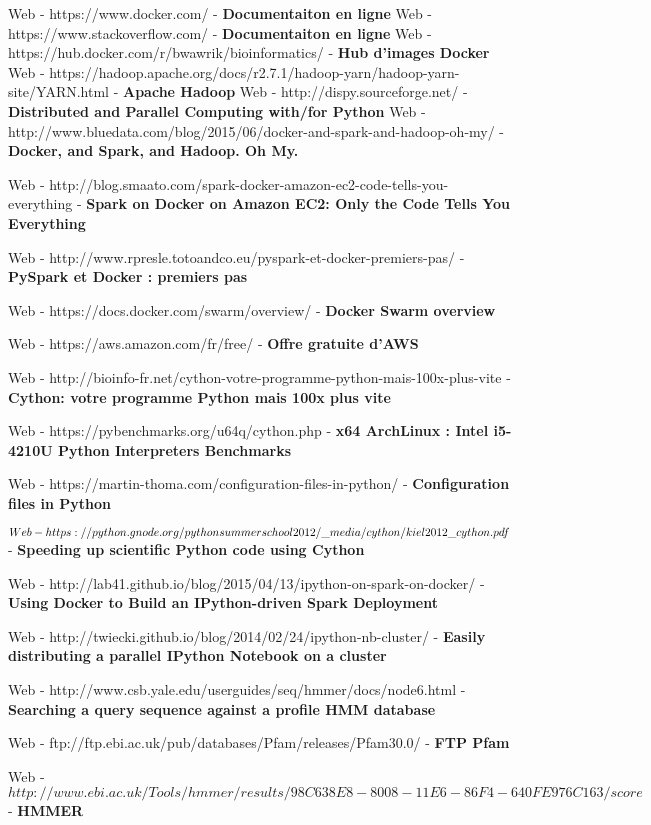 \cleardoublepage
\begin{thebibliography}{99}

Web - https://www.docker.com/ - \textbf{Documentaiton en ligne}
Web - https://www.stackoverflow.com/ - \textbf{Documentaiton en ligne}
Web - https://hub.docker.com/r/bwawrik/bioinformatics/ - \textbf{Hub d'images Docker}
Web - https://hadoop.apache.org/docs/r2.7.1/hadoop-yarn/hadoop-yarn-site/YARN.html - \textbf{Apache Hadoop}
Web - http://dispy.sourceforge.net/ - \textbf{Distributed and Parallel Computing with/for Python}
Web - http://www.bluedata.com/blog/2015/06/docker-and-spark-and-hadoop-oh-my/ - \textbf{Docker, and Spark, and Hadoop. Oh My.}

Web - http://blog.smaato.com/spark-docker-amazon-ec2-code-tells-you-everything - \textbf{Spark on Docker on Amazon EC2: Only the Code Tells You Everything}

Web - http://www.rpresle.totoandco.eu/pyspark-et-docker-premiers-pas/ - \textbf{PySpark et Docker : premiers pas}


Web - https://docs.docker.com/swarm/overview/ - \textbf{Docker Swarm overview}


Web - https://aws.amazon.com/fr/free/ - \textbf{Offre gratuite d'AWS}


Web - http://bioinfo-fr.net/cython-votre-programme-python-mais-100x-plus-vite - \textbf{Cython: votre programme Python mais 100x plus vite}


Web - https://pybenchmarks.org/u64q/cython.php - \textbf{x64 ArchLinux : Intel i5-4210U Python Interpreters Benchmarks}


Web - https://martin-thoma.com/configuration-files-in-python/ - \textbf{Configuration files in Python}

 $Web - https://python.g\-node.org/python\-summerschool\-2012/\_media/cython/kiel2012\_cython.pdf$ - \textbf{Speeding up scientific Python code using
Cython}

Web - http://lab41.github.io/blog/2015/04/13/ipython-on-spark-on-docker/ - \textbf{Using Docker to Build an IPython-driven Spark Deployment}

Web - http://twiecki.github.io/blog/2014/02/24/ipython-nb-cluster/ - \textbf{Easily distributing a parallel IPython Notebook on a cluster}

Web - http://www.csb.yale.edu/userguides/seq/hmmer/docs/node6.html - \textbf{Searching a query sequence against a profile HMM database}

Web - ftp://ftp.ebi.ac.uk/pub/databases/Pfam/releases/Pfam30.0/ - \textbf{FTP Pfam}

Web - $http://www.ebi.ac.uk/Tools/hmmer/results/98C638E8-8008-11E6-86F4-640FE976C163/score$ - \textbf{HMMER}


\end{thebibliography}